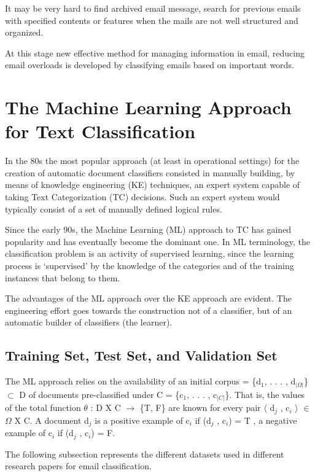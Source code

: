 It may be very hard to find archived email message, search for previous 
emails with specified contents or features when the mails are not well 
structured and organized.

At this stage new effective method for managing information in email, 
reducing email overloads is developed by classifying emails based on 
important words. \cite{taiwo2007}

\section{The Machine Learning Approach for Text Classification}
\label{sec:ml_approach_text_classification}

In the 80s the most popular approach (at least in operational settings) for the
creation of automatic document classifiers consisted in manually building, by means
of knowledge engineering (KE) techniques, an expert system capable of taking
Text Categorization (TC) decisions. Such an expert system would typically
consist of a set of manually defined logical rules.

Since the early 90s, the Machine Learning (ML) approach to TC has gained 
popularity and has eventually become the dominant one. In ML terminology, the 
classification problem is an activity of supervised learning, since the learning 
process is `supervised' by the knowledge of the categories and of the training 
instances that belong to them.

The advantages of the ML approach over the KE approach are evident. The 
engineering effort goes towards the construction not of a classifier, 
but of an automatic builder of classifiers (the learner). \cite{Sebastiani2002}

\subsection{Training Set, Test Set, and Validation Set}
The ML approach relies on the availability of an initial 
corpus = \{d$_{1}$, . . . , d$_{|\Omega|}$\} $\subset$ D of documents 
pre-classified under C = \{c$_{1}$, . . . , c$_{|C|}$\}. That is, the values of 
the total function $\theta$ : D X C $\rightarrow$ \{T, F\} are known for every 
pair $\langle$ d$_{j}$ , c$_{i}$ $\rangle$ $\in$   $\Omega$ X C. A document 
d$_{j}$ is a positive example of c$_{i}$ if (d$_{j}$ , c$_{i}$) = T , a negative 
example of c$_{i}$ if (d$_{j}$ , c$_{i}$) = F.

The following subsection represents the different datasets used in different research papers for email classification.
